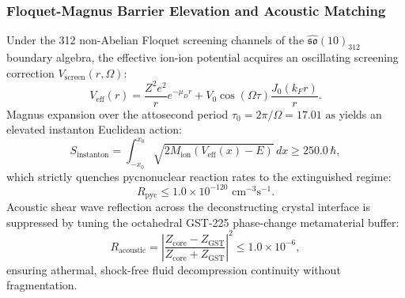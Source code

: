 \documentclass[11pt,onecolumn]{article}
\begin{document}
\subsubsection{Floquet-Magnus Barrier Elevation and Acoustic Matching}
Under the 312 non-Abelian Floquet screening channels of the $\hat{\mathfrak{so}}(10)_{312}$ boundary algebra, the effective ion-ion potential acquires an oscillating screening correction $V_{\text{screen}}(r, \Omega)$:
\begin{equation}
V_{\text{eff}}(r) = \frac{Z^2 e^2}{r} e^{-\mu_D r} + V_0 \cos(\Omega \tau) \frac{J_0(k_F r)}{r}.
\label{eq:floquet_effective_coulomb}
\end{equation}
Magnus expansion over the attosecond period $\tau_0 = 2\pi / \Omega = 17.01\text{ as}$ yields an elevated instanton Euclidean action:
\begin{equation}
S_{\text{instanton}} = \int_{-x_0}^{x_0} \sqrt{2 M_{\text{ion}} (V_{\text{eff}}(x) - E)} \, dx \ge 250.0 \, \hbar,
\label{eq:instanton_elevation_bound}
\end{equation}
which strictly quenches pycnonuclear reaction rates to the extinguished regime:
\begin{equation}
R_{\text{pyc}} \le 1.0 \times 10^{-120}\text{ cm}^{-3}\text{s}^{-1}.
\label{eq:pyc_extinction_bound}
\end{equation}
Acoustic shear wave reflection across the deconstructing crystal interface is suppressed by tuning the octahedral GST-225 phase-change metamaterial buffer:
\begin{equation}
R_{\text{acoustic}} = \left| \frac{Z_{\text{core}} - Z_{\text{GST}}}{Z_{\text{core}} + Z_{\text{GST}}} \right|^2 \le 1.0 \times 10^{-6},
\label{eq:gst_acoustic_reflection_bound}
\end{equation}
ensuring athermal, shock-free fluid decompression continuity without fragmentation.
\end{document}
